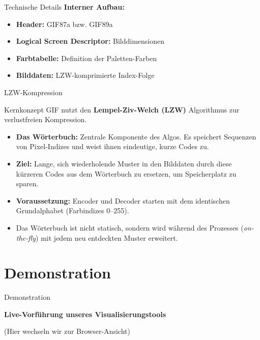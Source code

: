 \documentclass[aspectratio=169]{beamer}
\begin{document}
\begin{frame}{Technische Details}
    \textbf{Interner Aufbau:}
    \begin{itemize}
        \item \textbf{Header:} GIF87a bzw. GIF89a
        \item \textbf{Logical Screen Descriptor:} Bilddimensionen
        \item \textbf{Farbtabelle:} Definition der Paletten-Farben
        \item \textbf{Bilddaten:} LZW-komprimierte Index-Folge
    \end{itemize}
\end{frame}

\begin{frame}{LZW-Kompression}
    \begin{block}{Kernkonzept}
        GIF nutzt den \textbf{Lempel-Ziv-Welch (LZW)} Algorithmus zur verlustfreien Kompression.
    \end{block}
    \begin{itemize}
        \item \textbf{Das Wörterbuch:} Zentrale Komponente des Algos. Es speichert Sequenzen von Pixel-Indizes und weist ihnen eindeutige, kurze Codes zu.
        \item \textbf{Ziel:} Lange, sich wiederholende Muster in den Bilddaten durch diese kürzeren Codes aus dem Wörterbuch zu ersetzen, um Speicherplatz zu sparen.
        \item \textbf{Voraussetzung:} Encoder und Decoder starten mit dem identischen Grundalphabet (Farbindizes 0--255).
        \item Das Wörterbuch ist nicht statisch, sondern wird während des Prozesses (\textit{on-the-fly}) mit jedem neu entdeckten Muster erweitert.
    \end{itemize}
\end{frame}


\section{Demonstration}
\begin{frame}{Demonstration}
    \begin{center}
        \Large \textbf{Live-Vorführung unseres Visualisierungstools}

        \vspace{0.5cm}
        \small (Hier wechseln wir zur Browser-Ansicht)
    \end{center}
\end{frame}
\end{document}
